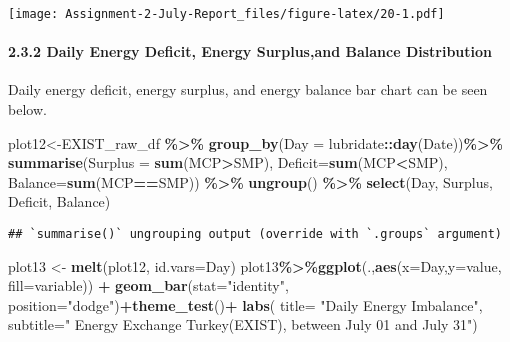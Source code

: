 \documentclass[
]{article}
\newenvironment{Shaded}{\begin{snugshade}}{\end{snugshade}}
\newcommand{\DataTypeTok}[1]{\textcolor[rgb]{0.13,0.29,0.53}{#1}}
\newcommand{\KeywordTok}[1]{\textcolor[rgb]{0.13,0.29,0.53}{\textbf{#1}}}
\newcommand{\NormalTok}[1]{#1}
\newcommand{\OperatorTok}[1]{\textcolor[rgb]{0.81,0.36,0.00}{\textbf{#1}}}
\newcommand{\StringTok}[1]{\textcolor[rgb]{0.31,0.60,0.02}{#1}}
\begin{document}
\texttt{[image: Assignment-2-July-Report\_files/figure-latex/20-1.pdf]}

\hypertarget{daily-energy-deficit-energy-surplusand-balance-distribution}{%
\paragraph{2.3.2 Daily Energy Deficit, Energy Surplus,and Balance
Distribution}\label{daily-energy-deficit-energy-surplusand-balance-distribution}}

Daily energy deficit, energy surplus, and energy balance bar chart can
be seen below.

\begin{Shaded}
\begin{Highlighting}[]
\NormalTok{plot12\textless{}{-}EXIST\_raw\_df }\OperatorTok{\%\textgreater{}\%}\StringTok{ }\KeywordTok{group\_by}\NormalTok{(}\DataTypeTok{Day =}\NormalTok{ lubridate}\OperatorTok{::}\KeywordTok{day}\NormalTok{(Date))}\OperatorTok{\%\textgreater{}\%}\StringTok{ }\KeywordTok{summarise}\NormalTok{(}\DataTypeTok{Surplus =} \KeywordTok{sum}\NormalTok{(MCP}\OperatorTok{\textgreater{}}\NormalTok{SMP), }\DataTypeTok{Deficit=}\KeywordTok{sum}\NormalTok{(MCP}\OperatorTok{\textless{}}\NormalTok{SMP), }\DataTypeTok{Balance=}\KeywordTok{sum}\NormalTok{(MCP}\OperatorTok{==}\NormalTok{SMP)) }\OperatorTok{\%\textgreater{}\%}\StringTok{ }\KeywordTok{ungroup}\NormalTok{() }\OperatorTok{\%\textgreater{}\%}
\KeywordTok{select}\NormalTok{(Day, Surplus, Deficit, Balance) }
\end{Highlighting}
\end{Shaded}

\begin{verbatim}
## `summarise()` ungrouping output (override with `.groups` argument)
\end{verbatim}

\begin{Shaded}
\begin{Highlighting}[]
\NormalTok{plot13 \textless{}{-}}\StringTok{ }\KeywordTok{melt}\NormalTok{(plot12, }\DataTypeTok{id.vars=}\StringTok{\textquotesingle{}Day\textquotesingle{}}\NormalTok{)}
\NormalTok{plot13}\OperatorTok{\%\textgreater{}\%}\KeywordTok{ggplot}\NormalTok{(.,}\KeywordTok{aes}\NormalTok{(}\DataTypeTok{x=}\NormalTok{Day,}\DataTypeTok{y=}\NormalTok{value, }\DataTypeTok{fill=}\NormalTok{variable)) }\OperatorTok{+}\StringTok{ }\KeywordTok{geom\_bar}\NormalTok{(}\DataTypeTok{stat=}\StringTok{"identity"}\NormalTok{, }\DataTypeTok{position=}\StringTok{"dodge"}\NormalTok{)}\OperatorTok{+}\KeywordTok{theme\_test}\NormalTok{()}\OperatorTok{+}
\StringTok{      }\KeywordTok{labs}\NormalTok{( }\DataTypeTok{title=}  \StringTok{"Daily Energy Imbalance"}\NormalTok{,}
            \DataTypeTok{subtitle=}\StringTok{" Energy Exchange Turkey(EXIST), between July 01 and July 31"}\NormalTok{)}
\end{Highlighting}
\end{Shaded}
\end{document}
